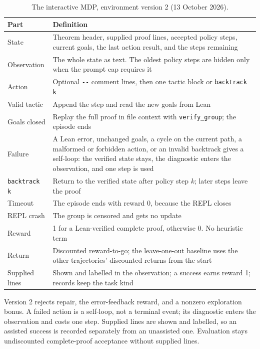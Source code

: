 \documentclass[11pt]{article}
\newcommand{\code}[1]{\texttt{#1}}
\begin{document}
\begin{table}[!htbp]
\centering
\small
\caption{The interactive MDP, environment version 2 (13 October 2026).}
\label{tab:mdp-v2}
\begin{tabularx}{\textwidth}{@{}P{2.6cm}Y@{}}
\toprule
Part & Definition \\
\midrule
State & Theorem header, supplied proof lines, accepted policy steps, current goals, the last action result, and the steps remaining \\
Observation & The whole state as text. The oldest policy steps are hidden only when the prompt cap requires it \\
Action & Optional \code{-{}-} comment lines, then one tactic block or \code{backtrack k} \\
Valid tactic & Append the step and read the new goals from Lean \\
Goals closed & Replay the full proof in file context with \code{verify\_group}; the episode ends \\
Failure & A Lean error, unchanged goals, a cycle on the current path, a malformed or forbidden action, or an invalid backtrack gives a self-loop: the verified state stays, the diagnostic enters the observation, and one step is used \\
\code{backtrack k} & Return to the verified state after policy step $k$; later steps leave the proof \\
Timeout & The episode ends with reward 0, because the REPL closes \\
REPL crash & The group is censored and gets no update \\
Reward & 1 for a Lean-verified complete proof, otherwise 0. No heuristic term \\
Return & Discounted reward-to-go; the leave-one-out baseline uses the other trajectories' discounted returns from the start \\
Supplied lines & Shown and labelled in the observation; a success earns reward 1; records keep the task kind \\
\bottomrule
\end{tabularx}
\end{table}

Version 2 rejects repair, the error-feedback reward, and a nonzero exploration bonus.
A failed action is a self-loop, not a terminal event; its diagnostic enters the observation and costs one step.
Supplied lines are shown and labelled, so an assisted success is recorded separately from an unassisted one.
Evaluation stays undiscounted complete-proof acceptance without supplied lines.
\end{document}
